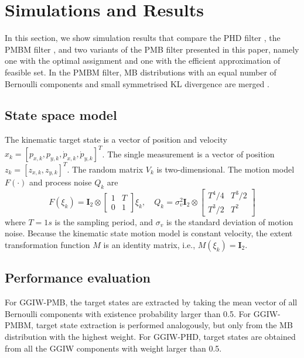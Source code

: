 \documentclass[conference]{IEEEtran}
\begin{document}
\section{Simulations and Results}
In this section, we show simulation results that compare the PHD filter \cite{phdextended2,phdextended3}, the PMBM filter \cite{pmbmextended,pmbmextended2}, and two variants of the PMB filter presented in this paper, namely one with the optimal assignment and one with the efficient approximation of feasible set. In the PMBM filter, MB distributions with an equal number of Bernoulli components and small symmetrised KL divergence are merged \cite{pmbmextended2}.

\subsection{State space model}
The kinematic target state is a vector of position and velocity $x_k=[p_{x,k},p_{y,k},\dot{p}_{x,k},\dot{p}_{y,k}]^T$. The single measurement is a vector of position $z_k=[z_{x,k},z_{y,k}]^T$.  The random matrix $V_k$ is two-dimensional. The motion model $F(\cdot)$ and process noise $Q_k$ are
\begin{equation*}
    F(\xi_k)=\mathbf{I}_2 \otimes \begin{bmatrix}
        1 & T\\
        0 & 1
    \end{bmatrix}\xi_k, \quad Q_k =  \sigma_v^2\mathbf{I}_2\otimes\begin{bmatrix}
        T^4/4 & T^3/2\\
        T^3/2 & T^2
    \end{bmatrix}
\end{equation*}
where $T=1s$ is the sampling period, and $\sigma_v$ is the standard deviation of motion noise. Because the kinematic state motion model is constant velocity, the extent transformation function $M$ is an identity matrix, i.e., $M(\xi_k) = \mathbf{I}_2$.

\subsection{Performance evaluation}
For GGIW-PMB, the target states are extracted by taking the mean vector of all Bernoulli components with existence probability larger than 0.5. For GGIW-PMBM, target state extraction is performed analogously, but only from the MB distribution with the highest weight. For GGIW-PHD, target states are obtained from all the GGIW components with weight larger than 0.5.
\end{document}
